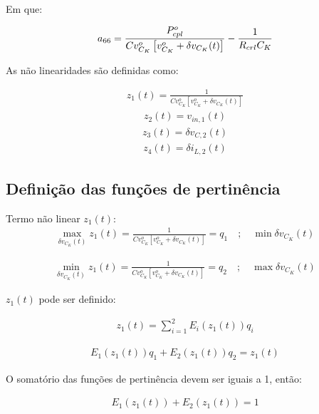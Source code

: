 Em que:

\begin{equation}
    a_{66} = \displaystyle \frac{P_{cpl}^o}{Cv_{C_K}^o \left[ v_{C_K}^o + \delta v_{C_K}(t) \right]} - \frac{1}{R_{crl} C_K}
\end{equation} 


As não linearidades são definidas como:

\begin{gather*}
    z_1(t) = \frac{1}{Cv_{C_K}^o \left[ v_{C_K}^o + \delta v_{C_K}(t) \right]}
\end{gather*}
\begin{gather*}
    z_2(t) = v_{in,1}(t)
\end{gather*}
\begin{gather*}
    z_3(t) = \delta v_{C,2}(t)
\end{gather*}
\begin{gather}
    z_4(t) = \delta i_{L,2}(t)
\end{gather}

\subsection*{Definição das funções de pertinência}

Termo não linear $z_1(t)$:
\begin{gather*}
    \max_{\delta v_{C_K}(t)} z_1(t) = \frac{1}{Cv_{C_K}^o \left[ v_{C_K}^o + \delta v_{C_K}(t) \right]} = q_1 \quad ; \quad \min \delta v_{C_K}(t)
\end{gather*}

\begin{gather}
    \min_{\delta v_{C_K}(t)} z_1(t) = \frac{1}{Cv_{C_K}^o \left[ v_{C_K}^o + \delta v_{C_K}(t) \right]} = q_2 \quad ; \quad \max \delta v_{C_K}(t)
\end{gather}

$z_1(t)$ pode ser definido:

\begin{gather*}
    z_1(t) = \sum\limits_{i=1}^{2} E_i(z_1(t))q_i
\end{gather*}

\begin{gather}\label{eq:z1_definition_by_membership_functions}
    E_1(z_1(t))q_1 + E_2(z_1(t))q_2 = z_1(t)
\end{gather}

O somatório das funções de pertinência devem ser iguais a 1, então:

\begin{gather}\label{eq:z1_membership_functions_sum}
    E_1(z_1(t)) + E_2(z_1(t)) = 1
\end{gather}

